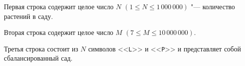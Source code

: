 Первая строка содержит целое число $N$ $(1 \le N \le 1\,000\,000)$ "--- количество растений в саду.

Вторая строка содержит целое число $M$ $(7 \le M \le 10\,000\,000)$.

Третья строка состоит из $N$ символов <<\texttt{L}>> и <<\texttt{P}>> и представляет собой
сбалансированный сад.
